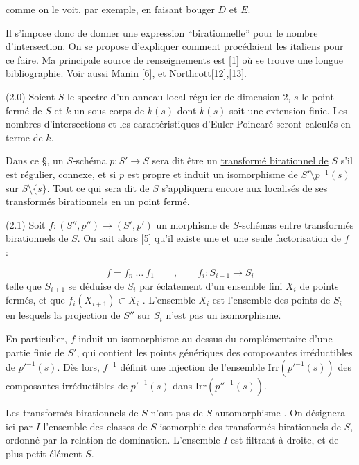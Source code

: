 
 comme on le voit, par exemple, en faisant bouger $D$ et $E$.

Il s'impose donc de donner une expression ``birationnelle'' pour le nombre d'intersection. On se propose d'expliquer comment procédaient les italiens pour ce faire. Ma principale source de renseignements est [1] où se trouve une longue bibliographie. Voir aussi Manin [6], et Northcott[12],[13].

(2.0) Soient $S$ le spectre d'un anneau local régulier de dimension 2, $s$ le point fermé de $S$ et $k$ un sous-corps de $k(s)$ dont $k(s)$ soit une extension finie. Les nombres d'intersections et les caractéristiques d'Euler-Poincaré seront calculés en terme de $k$.

Dans ce \S, un $S$-schéma $p : S' \longrightarrow S$ sera dit être un \underline{transformé birationnel de} $S$ s'il est régulier, connexe, et si $p$ est propre et induit un isomorphisme de $S' \setminus p^{-1}(s)$ sur $S \setminus \{s\}$. Tout ce qui sera dit de $S$ s'appliquera encore aux localisés de ses transformés birationnels en un point fermé.

(2.1) Soit $f : (S'',p'') \longrightarrow (S',p')$ un morphisme de $S$-schémas entre transformés birationnels de $S$. On sait alors [5] qu'il existe une et une seule factorisation de $f$ :

\begin{equation*}
f = f_n \ \ldots \ f_1 \qquad , \qquad f_i : S_{i+1} \longrightarrow S_i
\end{equation*}
telle que $S_{i+1}$ se déduise de $S_i$ par éclatement d'un ensemble fini $X_i$ de points fermés, et que $f_i(X_{i+1}) \subset X_i$ . L'ensemble $X_i$ est l'ensemble des points de $S_i$ en lesquels la projection de $S''$ sur $S_i$ n'est pas un isomorphisme.

En particulier, $f$ induit un isomorphisme au-dessus du complémentaire d'une partie finie de $S'$, qui contient les points génériques des composantes irréductibles de $p'^{-1}(s)$. Dès lors, $f^{-1}$ définit une injection
de l'ensemble $\mathrm{Irr}({p'}^{-1}(s))$ des composantes irréductibles de ${p'}^{-1}(s)$ dans $\mathrm{Irr}({p''}^{-1}(s))$.

Les transformés birationnels de $S$ n'ont pas de $S$-automorphisme . On désignera ici par $I$ l'ensemble des classes de $S$-isomorphie des transformés birationnels de $S$, ordonné par la relation de domination. L'ensemble $I$ est filtrant à droite, et de plus petit élément $S$.


